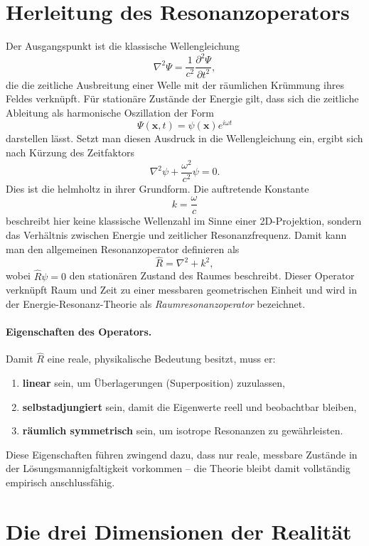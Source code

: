 \section{Herleitung des Resonanzoperators}

Der Ausgangspunkt ist die klassische Wellengleichung
\[
\nabla^2 \Psi = \frac{1}{c^2} \frac{\partial^2 \Psi}{\partial t^2},
\]
die die zeitliche Ausbreitung einer Welle mit der räumlichen Krümmung ihres Feldes verknüpft.
Für stationäre Zustände der Energie gilt, dass sich die zeitliche Ableitung
als harmonische Oszillation der Form
\[
\Psi(\mathbf{x},t) = \psi(\mathbf{x}) e^{i\omega t}
\]
darstellen lässt.
Setzt man diesen Ausdruck in die Wellengleichung ein, ergibt sich nach Kürzung des Zeitfaktors
\[
\nabla^2 \psi + \frac{\omega^2}{c^2}\psi = 0.
\]
Dies ist die \gls{helmholtz} in ihrer Grundform.
Die auftretende Konstante
\[
k = \frac{\omega}{c}
\]
beschreibt hier keine klassische Wellenzahl im Sinne einer 2D-Projektion,
sondern das Verhältnis zwischen Energie und zeitlicher Resonanzfrequenz.
Damit kann man den allgemeinen Resonanzoperator definieren als
\[
\hat{R} = \nabla^2 + k^2,
\]
wobei $\hat{R}\psi = 0$ den stationären Zustand des Raumes beschreibt.
Dieser Operator verknüpft Raum und Zeit zu einer messbaren geometrischen Einheit
und wird in der Energie-Resonanz-Theorie als \emph{Raumresonanzoperator} bezeichnet.

\paragraph{Eigenschaften des Operators.}
Damit $\hat{R}$ eine reale, physikalische Bedeutung besitzt, muss er:
\begin{enumerate}
    \item \textbf{linear} sein, um Überlagerungen (Superposition) zuzulassen,
    \item \textbf{selbstadjungiert} sein, damit die Eigenwerte reell und beobachtbar bleiben,
    \item \textbf{räumlich symmetrisch} sein, um isotrope Resonanzen zu gewährleisten.
\end{enumerate}
Diese Eigenschaften führen zwingend dazu, dass nur reale, messbare Zustände
in der Lösungsmannigfaltigkeit vorkommen – die Theorie bleibt damit
vollständig empirisch anschlussfähig.

\section{Die drei Dimensionen der Realität}

